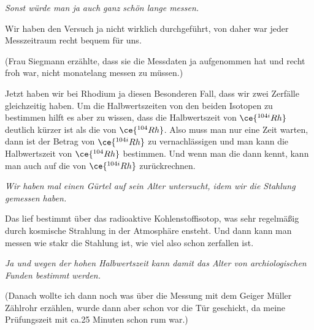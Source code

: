\textit{Sonst würde man ja auch ganz schön lange messen.}

Wir haben den Versuch ja nicht wirklich durchgeführt, von daher war jeder Messzeitraum recht bequem für uns.

(Frau Siegmann erzählte, dass sie die Messdaten ja aufgenommen hat und recht froh war, nicht monatelang messen zu müssen.)

Jetzt haben wir bei Rhodium ja diesen Besonderen Fall, dass wir zwei Zerfälle gleichzeitig haben. Um die Halbwertszeiten von den beiden 
Isotopen zu bestimmen hilft es aber zu wissen, dass die Halbwertszeit von $\ce{^{104i}Rh}$ deutlich kürzer ist als die von 
$\ce{^{104}Rh}$. Also muss man nur eine Zeit warten, dann ist der Betrag von $\ce{^{104i}Rh}$ zu vernachlässigen und man kann die 
Halbwertszeit von $\ce{^{104}Rh}$ bestimmen. Und wenn man die dann kennt, kann man auch auf die von $\ce{^{104i}Rh}$ zurückrechnen. 

\textit{Wir haben mal einen Gürtel auf sein Alter untersucht, idem wir die Stahlung gemessen haben.}

Das lief bestimmt über das radioaktive Kohlenstoffisotop, was sehr regelmäßig durch kosmische Strahlung in der Atmosphäre ensteht. Und 
dann kann man messen wie stakr die Stahlung ist, wie viel also schon zerfallen ist. 

\textit{Ja und wegen der hohen Halbwertszeit kann damit das Alter von archiologischen Funden bestimmt werden.}

(Danach wollte ich dann noch was über die Messung mit dem Geiger Müller Zählrohr erzählen, wurde dann aber schon vor die Tür geschickt,
da meine Prüfungszeit mit ca.25 Minuten schon rum war.)